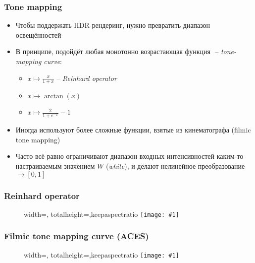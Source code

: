 \documentclass[10pt,handout]{beamer}
\newcommand{\slideimage}[1]{
  \begin{figure}
    \begin{adjustbox}{width=\textwidth, totalheight=\textheight-2\baselineskip-2\baselineskip,keepaspectratio}
      \texttt{[image: \#1]}
    \end{adjustbox}
  \end{figure}
}
\begin{document}
\begin{frame}[fragile]
\frametitle{Tone mapping}
\begin{itemize}
\item Чтобы поддержать HDR рендеринг, нужно превратить диапазон освещённостей \begin{math}[0, \infty)\end{math} в диапазон \begin{math}[0, 1]\end{math}
\pause
\item В принципе, подойдёт любая монотонно возрастающая функция \begin{math}[0, \infty)\rightarrow [0, 1]\end{math} -- \textit{tone-mapping curve}:
\begin{itemize}
\item \begin{math}x \mapsto \frac{x}{1+x}\end{math} -- \textit{Reinhard operator}
\item \begin{math}x \mapsto \arctan(x)\end{math}
\item \begin{math}x \mapsto \frac{2}{1+e^{-x}}-1\end{math}
\end{itemize}
\pause
\item Иногда используют более сложные функции, взятые из кинематографа (filmic tone mapping)
\pause
\item Часто всё равно ограничивают диапазон входных интенсивностей каким-то настраиваемым значением \begin{math}W\end{math} (\textit{white}), и делают нелинейное преобразование \begin{math}[0, W] \rightarrow [0, 1]\end{math}
\end{itemize}
\end{frame}

\begin{frame}[fragile]
\frametitle{Reinhard operator}
\slideimage{reinhard.png}
\end{frame}

\begin{frame}[fragile]
\frametitle{Filmic tone mapping curve (ACES)}
\slideimage{aces.png}
\end{frame}
\end{document}
